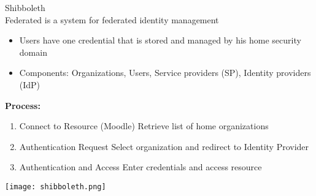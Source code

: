 \begin{definition}{Shibboleth}\\
    Federated is a system for federated identity management
    \begin{itemize}
        \item Users have one credential that is stored and managed by his home security domain
        \item Components: Organizations, Users, Service providers (SP), Identity providers (IdP)
    \end{itemize}
    
    \textbf{Process:}
    \begin{enumerate}
        \item Connect to Resource (Moodle) Retrieve list of home organizations
        \item Authentication Request Select organization and redirect to Identity Provider
        \item Authentication and Access Enter credentials and access resource
    \end{enumerate}
\end{definition}

\texttt{[image: shibboleth.png]}